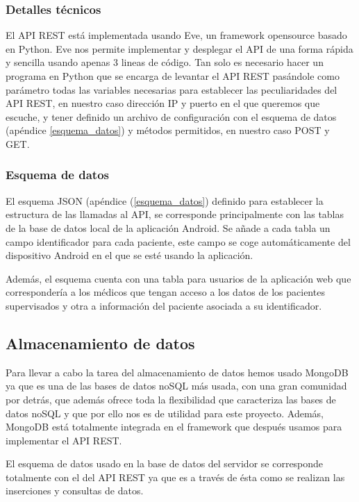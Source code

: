 \documentclass[11pt,spanish]{article}
\begin{document}
\subsubsection{Detalles técnicos}
El API REST está implementada usando Eve, un framework opensource basado en Python. Eve nos permite implementar y desplegar el API de una forma rápida y sencilla usando apenas 3 lineas de código. Tan solo es necesario hacer un programa en Python que se encarga de levantar el API REST pasándole como parámetro todas las variables necesarias para establecer las peculiaridades del API REST, en nuestro caso dirección IP y puerto en el que queremos que escuche, y tener definido un archivo de configuración con el esquema de datos (apéndice \ref{esquema_datos}) y métodos permitidos, en nuestro caso POST y GET.

\subsubsection{Esquema de datos}

El esquema JSON (apéndice (\ref{esquema_datos}) definido para establecer la estructura de las llamadas al API, se corresponde principalmente con las tablas de la base de datos local de la aplicación Android. Se añade a cada tabla un campo identificador para cada paciente, este campo se coge automáticamente del dispositivo Android en el que se esté usando la aplicación.
\newline

Además, el esquema cuenta con una tabla para usuarios de la aplicación web que correspondería a los médicos que tengan acceso a los datos de los pacientes supervisados y otra a información del paciente asociada a su identificador.
\newline

\subsection{Almacenamiento de datos}
Para llevar a cabo la tarea del almacenamiento de datos hemos usado MongoDB ya que es una de las bases de datos noSQL más usada, con una gran comunidad por detrás, que además ofrece toda la flexibilidad que caracteriza las bases de datos noSQL y que por ello nos es de utilidad para este proyecto. Además, MongoDB está totalmente integrada en el framework que después usamos para implementar el API REST.
\newline

El esquema de datos usado en la base de datos del servidor se corresponde totalmente con el del API REST ya que es a través de ésta como se realizan las inserciones y consultas de datos.
\end{document}
